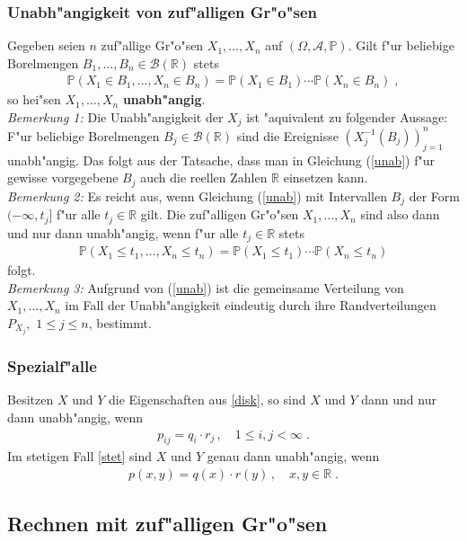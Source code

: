 \documentclass[ngerman,draft,parskip=half,twoside]{scrartcl}
\newcommand*{\R}{\mathbb{R}}      %
\newcommand*{\Algeb}{\mathcal{A}}   %
\newcommand*{\BorelM}{\mathcal{B}}  %
\newcommand*{\WKM}{\mathbb{P}}      %
\begin{document}
\subsubsection{Unabh"angigkeit von zuf"alligen Gr"o"sen}
Gegeben seien $n$ zuf"allige Gr"o"sen $X_1,\ldots,X_n$ auf $(\Omega,\Algeb,\WKM)$. Gilt f"ur beliebige
Borelmengen $B_1,\ldots,B_n\in\BorelM(\R)$ stets
\begin{gather}
\label{unab}
\WKM(X_1\in B_1,\ldots,X_n\in B_n)=\WKM(X_1\in B_1)\cdots\WKM(X_n\in B_n)\;,
\end{gather}
so hei"sen $X_1,\ldots,X_n$ \textbf{unabh"angig}.\\
\textit{Bemerkung 1:} Die Unabh"angigkeit der $X_j$ ist "aquivalent zu folgender Aussage: F"ur
beliebige Borelmengen $B_j\in\BorelM(\R)$ sind die Ereignisse $\left(X_j^{-1}(B_j)\right)_{j=1}^n$
unabh"angig. Das folgt aus der Tatsache, dass man in Gleichung (\ref{unab}) f"ur gewisse vorgegebene $B_j$ auch die
reellen Zahlen $\R$ einsetzen kann.\\
\textit{Bemerkung 2:} Es reicht aus, wenn Gleichung (\ref{unab}) mit Intervallen $B_j$ der Form
$(-\infty,t_j]$ f"ur alle $t_j\in\R$ gilt. Die zuf"alligen Gr"o"sen $X_1,\ldots,X_n$ sind also
dann und nur dann unabh"angig, wenn f"ur alle $t_j\in\R$ stets
\begin{gather*}
  \WKM(X_1\le t_1,\ldots,X_n\le t_n)=\WKM(X_1\le t_1)\cdots\WKM(X_n\le t_n)
\end{gather*}
folgt.\\
\textit{Bemerkung 3:} Aufgrund von (\ref{unab}) ist die gemeinsame Verteilung von $X_1,\ldots,X_n$
im Fall der Unabh"angigkeit eindeutig durch
ihre Randverteilungen $P_{X_j},$ $1\le j\le n$, bestimmt.
\subsubsection{Spezialf"alle}
Besitzen $X$ und $Y$ die Eigenschaften aus \ref{disk}, so sind $X$ und $Y$ dann und nur  dann
unabh"angig, wenn
\begin{gather*}
  p_{ij}=q_i\cdot r_j\,,\quad 1\le i,j<\infty\;.
\end{gather*}
Im stetigen Fall \ref{stet} sind $X$ und $Y$ genau dann unabh"angig, wenn
\begin{gather*}
  p(x,y)=q(x)\cdot r(y)\,,\quad x,y\in\R\;.
\end{gather*}
\subsection{Rechnen mit zuf"alligen Gr"o"sen}
\end{document}
